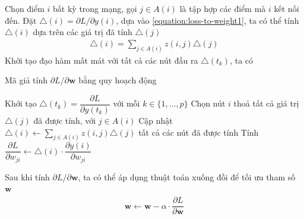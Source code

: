 Chọn điểm $i$ bất kỳ trong mạng, gọi $j\in A(i)$ là tập hợp các điểm mà $i$ kết nối đến. Đặt $\triangle(i)=\partial L/\partial y(i)$, dựa vào \ref{equation:loss-to-weight1}, ta có thể tính $\triangle(i)$ dựa trên các giá trị đã tính $\triangle(j)$
\begin{align}
    \triangle(i)=\sum_{j\in A(i)}z(i,j)\triangle(j)
\end{align}
Khởi tạo đạo hàm mất mát với tất cả các nút đầu ra $\triangle(t_k)$, ta có
\begin{algorithm}[htb]
    \caption{Mã giả tính $\partial L/\partial\mathbf{w}$ bằng quy hoạch động \cite{Aggarwal2023}}
    \label{algorithm:dynamic-programming-loss-to-weight}
    \begin{algorithmic}[1]
        \State Khởi tạo $\triangle(t_k)=\dfrac{\partial L}{\partial y(t_k)}$ với mỗi $k\in\{1,\dots,p\}$
        \Repeat
        \State Chọn nút $i$ thoả tất cả giá trị $\triangle(j)$ đã được tính, với $j\in A(i)$
        \State Cập nhật $\triangle(i)\gets\sum_{j\in A(i)}z(i,j)\triangle(j)$
        \Until tất cả các nút đã được tính
        \State Tính $\dfrac{\partial L}{\partial w_{ji}}\gets\triangle(i)\cdot\dfrac{\partial y(i)}{\partial w_{ji}}$
        \EndFor
    \end{algorithmic}
\end{algorithm}

Sau khi tính $\partial L/\partial\mathbf{w}$, ta có thể áp dụng thuật toán xuống đồi để tối ưu tham số $\mathbf{w}$
\begin{align}
    \mathbf{w}\leftarrow\mathbf{w}-\alpha\cdot\dfrac{\partial L}{\partial\mathbf{w}}
\end{align}

